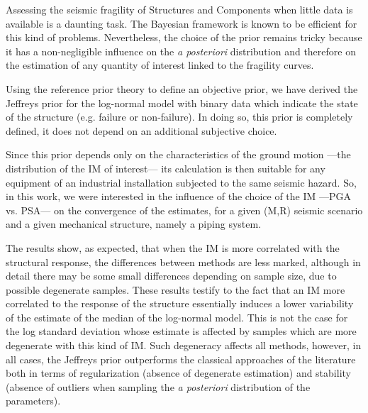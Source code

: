 Assessing the seismic fragility of Structures and Components when little data is available is a daunting task. The Bayesian framework is known to be efficient for this kind of problems. Nevertheless, the choice of the prior remains tricky because it has a non-negligible influence on the  \emph{a posteriori} distribution and therefore on the estimation of any quantity of interest linked to the fragility curves.

Using the reference prior theory to define an objective prior, we have derived the Jeffreys prior for the log-normal model with binary data which indicate the state of the structure (e.g. failure or non-failure). In doing so, this prior is completely defined, it does not depend on an additional subjective choice.

Since this prior depends only on the characteristics of the ground motion ---the distribution of the IM of interest--- its calculation is then suitable for any equipment of an industrial installation subjected to the same seismic hazard. So, in this work, we were interested in the influence of the choice of the IM ---PGA vs. PSA--- on the convergence of the estimates, for a given (M,R) seismic scenario and a given mechanical structure, namely a piping system.

The results show, as expected, that when the IM is more correlated with the structural response, the differences between methods are less marked, although in detail there may be some small differences depending on sample size, due to possible degenerate samples. {These results testify to the fact that an IM more correlated to the response of the structure essentially induces a lower variability of the estimate of the median of the log-normal model. This is not the case for the log standard deviation whose estimate is affected by samples which are more degenerate with this kind of IM. Such degeneracy affects all methods,} however, in all cases, the Jeffreys prior outperforms the classical approaches of the literature both in terms of regularization (absence of
degenerate estimation) and stability (absence of outliers when sampling the \emph{a posteriori} distribution of the parameters).
